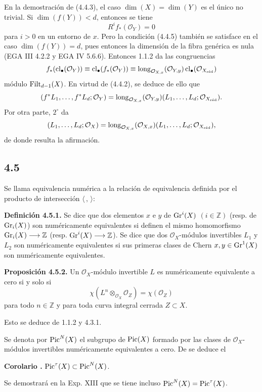 En la demostración de (4.4.3), el caso \(\dim(X)=\dim(Y)\) es el único no
trivial. Si \(\dim(f(Y))<d\), entonces se tiene
\begin{equation}\tag{4.4.5}
 R^if_*(\mathcal O_Y)=0
\end{equation}
para \(i>0\) en un entorno de \(x\). Pero la condición (4.4.5) también se
satisface en el caso \(\dim(f(Y))=d\), pues entonces la dimensión de la
fibra genérica es nula (EGA III 4.2.2 y EGA IV 5.6.6). Entonces 1.1.2 da las
congruencias
\[
 f_*(\cl_\bullet(\mathcal O_Y))
 \equiv \cl_\bullet(f_*(\mathcal O_Y)\sisi{}{)} %
 \equiv
 \len_{\mathcal O_{X,x}}(\mathcal O_{Y,y})
 \cl_\bullet(\mathcal O_{X_{\red}})
\]
módulo \(\Filt_{d-1}(X)\). En virtud de (4.4.2), se deduce de ello que
\[
 (f^*L_1,\ldots,f^*L_d;\mathcal O_Y)
 =
 \len_{\mathcal O_{X,x}}(\mathcal O_{Y,y})
 (L_1,\ldots,L_d;\mathcal O_{X_{\red}}).
\]
Por otra parte, \(2^\circ\) da
\[
 (L_1,\ldots,L_d;\mathcal O_X)
 =
 \len_{\mathcal O_{X,x}}(\mathcal O_{X,x})
 (L_1,\ldots,L_d;\mathcal O_{X_{\red}}),
\]
de donde resulta la afirmación.

\subsection*{4.5}
Se llama equivalencia numérica a la relación de equivalencia definida por
el producto de intersección \(\langle\, ,\,\rangle\):

\textbf{Definición 4.5.1.} Se dice que dos elementos \(x\) e \(y\) de
\(\Gr^i(X)\) \((i\in\mathbb Z)\) (resp. de \(\Gr_i(X)\)) son numéricamente
equivalentes si definen el mismo homomorfismo
\(\Gr_i(X)\longrightarrow\mathbb Z\) (resp.
\(\Gr^i(X)\longrightarrow\mathbb Z\)). Se dice que dos
\(\mathcal O_X\)-módulos invertibles \(L_1\) y \(L_2\) son numéricamente
equivalentes si sus primeras clases de Chern
\(x,y\in\Gr^1(X)\) son numéricamente equivalentes.

\textbf{Proposición 4.5.2.} Un \(\mathcal O_X\)-módulo invertible \(L\) es
numéricamente equivalente a cero si y solo si
\begin{equation}\tag{4.5.3}
 \chi(L^n\otimes_{\mathcal O_X}\mathcal O_Z)=\chi(\mathcal O_Z)
\end{equation}
para todo \(n\in\mathbb Z\) y para toda curva integral cerrada
\(Z\subset X\).

Esto se deduce de 1.1.2 y 4.3.1.

Se denota por \(\Pic^N(X)\) el subgrupo de \(\Pic(X)\) formado por las
clases de \(\mathcal O_X\)-módulos invertibles numéricamente equivalentes a
cero. De  se deduce el %

\textbf{Corolario .} \(\Pic^\tau(X)\subset \Pic^N(X)\). %

Se demostrará en la Exp. XIII que se tiene incluso
\(\Pic^N(X)=\Pic^\tau(X)\).
